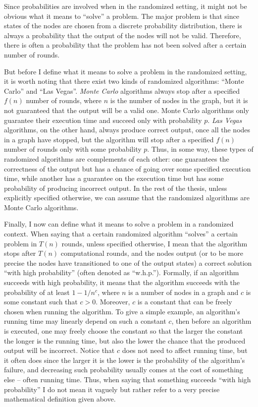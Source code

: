 Since probabilities are involved when in the randomized setting, it might not be
obvious what it means to ``solve'' a problem. The major problem is that
since states of the nodes are chosen from a discrete probability distribution,
there is always a probability that the output of the nodes will not be valid.
Therefore, there is often a probability that the problem has not been solved
after a certain number of rounds.

But before I define what it means to solve a problem in the randomized setting, it is
worth noting that there exist two kinds of randomized algorithms: ``Monte Carlo'' and
``Las Vegas''. \emph{Monte Carlo} algorithms always stop after a specified $f(n)$
number of rounds, where $n$ is the number of nodes in the graph, but
it is not guaranteed that the output will be a valid one. Monte Carlo algorithms
only guarantee their execution time and succeed only with probability $p$.
\emph{Las Vegas} algorithms, on the other hand, always produce correct output,
once all the nodes in a graph have stopped, but the algorithm will stop after a
specified $f(n)$ number of rounds only with some probability $p$. Thus, in some
way, these types of randomized algorithms are complements of each other:
one guarantees the correctness of the output but has a chance of going over some
specified execution time, while another has a guarantee on the execution time
but has some probability of producing incorrect output. In the rest of the thesis,
unless explicitly specified otherwise, we can assume that the randomized algorithms
are Monte Carlo algorithms.

Finally, I now can define what it means to solve a problem in a randomized context.
When saying that a certain randomized algorithm ``solves'' a certain problem in
$T(n)$ rounds, unless specified otherwise, I mean that the algorithm stops after
$T(n)$ computational rounds, and the nodes output (or to be more precise the nodes
have transitioned to one of the output states) a correct solution ``with high
probability'' (often denoted as ``w.h.p.''). Formally, if an algorithm succeeds with
high probability, it means that the algorithm succeeds with the probability of at least
$1 - 1 / n^c$, where $n$ is a number of nodes in a graph and $c$ is some constant
such that $c > 0$. Moreover, $c$ is a constant that can be freely chosen when 
running the algorithm. To give a simple example, an algorithm's running time may
linearly depend on such a constant $c$, then before an algorithm is executed,
one may freely choose the constant so that the larger the constant the longer is
the running time, but also the lower the chance that the produced output will
be incorrect. Notice that $c$ does not need to affect running time, but it often
does since the larger it is the lower is the probability of the algorithm's failure,
and decreasing such probability usually comes at the cost of something else -- 
often running time. Thus, when saying that something succeeds ``with high probability''
I do not mean it vaguely but rather refer to a very precise mathematical definition
given above.

